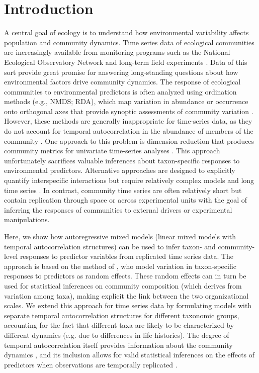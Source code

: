 \section*{Introduction}

A central goal of ecology is to understand how environmental variability affects
population and community dynamics.
Time series data of ecological communities are increasingly available from monitoring programs such as the
National Ecological Observatory Network \citep{Keller2008} and
long-term field experiments \citep[e.g.][]{Fraser2013, Cowles2018, Shi2015}.
Data of this sort provide great promise for answering long-standing questions about
how environmental factors drive community dynamics.
The response of ecological communities to environmental predictors is often analyzed
using ordination methods (e.g., NMDS; RDA), which map variation in abundance or
occurrence onto orthogonal axes that provide synoptic assessments of community
variation \citep{Mcgarigal2013}.
However, these methods are generally inappropriate for time-series data, as they
do not account for temporal autocorrelation in the abundance of members of the
community \citep{Ives2006}.
One approach to this problem is dimension reduction 
that produces community metrics for univariate time-series analyses \citep{Simpson2009}.
This approach unfortunately sacrifices valuable inferences about taxon-specific responses 
to environmental predictors.
Alternative approaches are designed to explicitly quantify interspecific interactions
but require relatively complex models and long time series \citep{Ives1999, Hampton2013}.
In contrast, community time series are often relatively short but contain
replication through space or across experimental units with the goal of
inferring the responses of communities to external drivers or experimental manipulations.

Here, we show how autoregressive mixed models (linear mixed models with temporal
autocorrelation structures) can be used to infer taxon- and community-level responses
to predictor variables from replicated time series data.
The approach is based on the method of \cite{Jackson2012}, who model variation in
taxon-specific responses to predictors as random effects.
These random effects can in turn be used for statistical inferences on community composition 
(which derives from variation among taxa),
making explicit the link between the two organizational scales.
We extend this approach for time series data by formulating models with separate
temporal autocorrelation structures for different taxonomic groups, accounting for
the fact that different taxa are likely to be characterized by different dynamics
(e.g. due to differences in life histories).
The degree of temporal autocorrelation itself provides information 
about the community dynamics \citep{Ives1999},
and its inclusion allows for valid statistical inferences on the effects of predictors 
when observations are temporally replicated \citep{Ives2006}.

